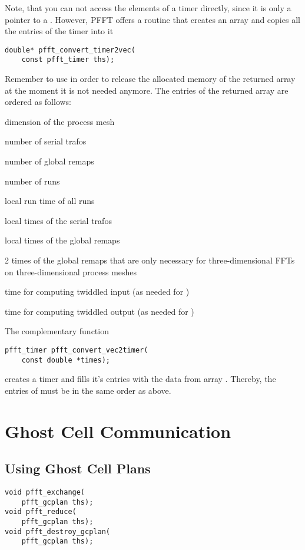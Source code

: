 Note, that you can not access the elements of a timer directly, since it is only a pointer to a .
However, PFFT offers a routine that creates an array and copies all the entries of the timer into it
\begin{lstlisting}
double* pfft_convert_timer2vec(
    const pfft_timer ths);
\end{lstlisting}
Remember to use  in order to release the allocated memory of the returned array at the moment it is not needed anymore.
The entries of the returned array are ordered as follows:
\begin{compactitem}
  \item dimension of the process mesh 
  \item number of serial trafos 
  \item number of global remaps 
  \item number of  runs 
  \item local run time of all runs
  \item {} local times of the serial trafos
  \item {} local times of the global remaps
  \item 2 times of the global remaps that are only necessary for three-dimensional FFTs on three-dimensional process meshes
  \item time for computing twiddled input (as needed for ) 
  \item time for computing twiddled output (as needed for ) 
\end{compactitem}
The complementary function
\begin{lstlisting}
pfft_timer pfft_convert_vec2timer(
    const double *times);
\end{lstlisting}
creates a timer and fills it's entries with the data from array . Thereby, the entries of 
must be in the same order as above. 



\section{Ghost Cell Communication}
\subsection{Using Ghost Cell Plans}
\begin{lstlisting}
void pfft_exchange(
    pfft_gcplan ths);
void pfft_reduce(
    pfft_gcplan ths);
void pfft_destroy_gcplan(
    pfft_gcplan ths);
\end{lstlisting}


